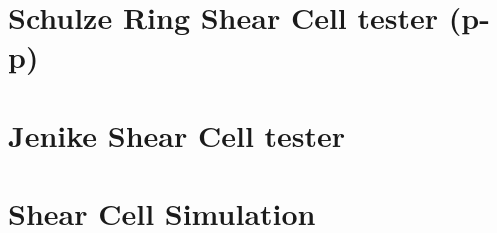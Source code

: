 \section{Schulze Ring Shear Cell tester (p-p)}
\label{sec:SRSCT}

\lipsum[1]

\section{Jenike Shear Cell tester}
\label{sec:jsct}

\lipsum[1]

% 
% 
% 

\lipsum[3]

\section{Shear Cell Simulation}
\label{sec:scsimulation}

\lipsum[1]


% 

% 
% 
% 


\lipsum[1]
